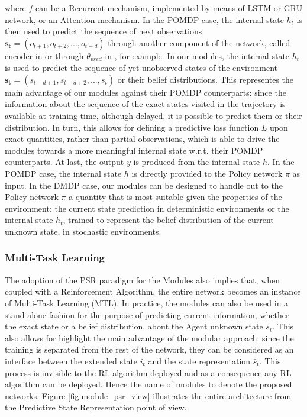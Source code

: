                 where $f$ can be a Recurrent mechanism, implemented by means of LSTM or GRU network, or an Attention mechanism. In the POMDP case, the internal state $h_t$ is then used to predict the sequence of next observations $\mathbf{s_t} = (o_{t+1}, o_{t+2}, ..., o_{t+d})$ through another component of the network, called encoder in  or through $\theta_{pred}$ in , for example. In our modules, the internal state $h_t$ is used to predict the sequence of yet unobserved states of the environment $\mathbf{s_t} = (s_{t-d+1}, s_{t-d+2}, ..., s_t)$ or their belief distributions. This representes the main advantage of our modules against their POMDP counterparts: since the information about the sequence of the exact states visited in the trajectory is available at training time, although delayed, it is possible to predict them or their distribution. In turn, this allows for defining a predictive loss function $L$ upon exact quantities, rather than partial observations, which is able to drive the modules towards a more meaningful internal state w.r.t. their POMDP counterparts. \newline
                At last, the output $y$ is produced from the internal state $h$. In the POMDP case, the internal state $h$ is directly provided to the Policy network $\pi$ as input. In the DMDP case, our modules can be designed to handle out to the Policy network $\pi$ a quantity that is most suitable given the properties of the environment: the current state prediction in deterministic environments or the internal state $h_t$, trained to represent the belief distribution of the current unknown state, in stochastic environments.
                
            \subsubsection{Multi-Task Learning}
                The adoption of the PSR paradigm for the Modules also implies that, when coupled with a Reinforcement Algorithm, the entire network becomes an instance of Multi-Task Learning (MTL). In practice, the modules can also be used in a stand-alone fashion for the purpose of predicting current information, whether the exact state or a belief distribution, about the Agent unknown state $s_t$. \newline
                This also allows for highlight the main advantage of the modular approach: since the training is separated from the rest of the network, they can be considered as an interface between the extended state $i_t$ and the state representation $\bar{s}_t$. This process is invisible to the RL algorithm deployed and as a consequence any RL algorithm can be deployed. Hence the name of modules to denote the proposed networks. Figure \ref{fig:module_psr_view} illustrates the entire architecture from the Predictive State Representation point of view.
                
